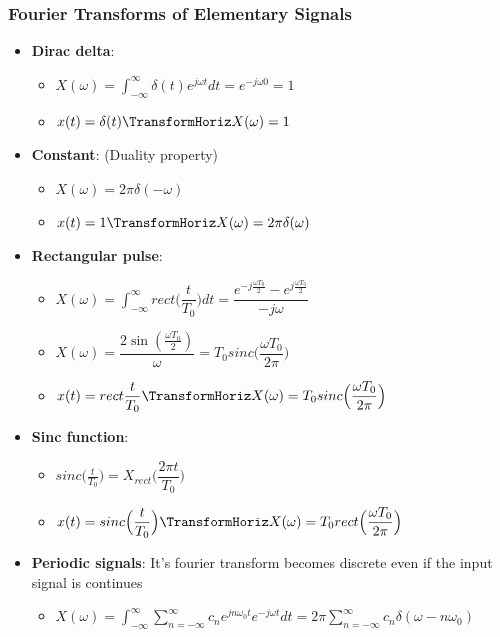 \subsubsection{Fourier Transforms of Elementary Signals}
\begin{itemize}
    \item \textbf{Dirac delta}:  
    \begin{itemize}
        \item $X(\omega) = \int_{-\infty}^{\infty} \delta(t)e^{j\omega t} dt = e^{-j\omega0} = 1$
        \item $x(t)=\delta(t) \TransformHoriz X(\omega)=1$
    \end{itemize}
    \item \textbf{Constant}: (Duality property)
    \begin{itemize}
        \item $X(\omega) = 2\pi\delta(-\omega)$
        \item $x(t)=1 \TransformHoriz X(\omega)=2\pi\delta(\omega)$
    \end{itemize}
    \item \textbf{Rectangular pulse}:
    \begin{itemize}
        \item $X(\omega) = \int_{-\infty}^{\infty} rect\Big( \dfrac{t}{T_0} \Big) dt = \dfrac{e^{-j\frac{\omega T_0}{2}}-e^{j\frac{\omega T_0}{2}}}{-j\omega}$
        \item $X(\omega) = \dfrac{2\sin(\frac{\omega T_0}{2})}{\omega} = T_0 sinc\Big( \dfrac{\omega T_0}{2\pi} \Big)$
        \item $x(t)=rect\dfrac{t}{T_0} \TransformHoriz X(\omega) = T_0 sinc\Big( \dfrac{\omega T_0}{2\pi} \Big)$
    \end{itemize}
    \item \textbf{Sinc function}:
    \begin{itemize}
        \item $sinc\Big( \frac{t}{T_0} \Big) = X_{rect}\Big( \dfrac{2\pi t}{T_0} \Big)$
        \item $x(t) = sinc\Big( \dfrac{t}{T_0} \Big) \TransformHoriz X(\omega) = T_0 rect\Big( \dfrac{\omega T_0}{2\pi} \Big)$
    \end{itemize}
    \item \textbf{Periodic signals}: It's fourier transform becomes discrete even if the input signal is continues
    \begin{itemize}
        \item $X(\omega) = \int_{-\infty}^{\infty} \sum_{n=-\infty}^{\infty} c_n e^{jn\omega_0 t} e^{-j\omega t} dt = 2\pi\sum_{n=-\infty}^{\infty} c_n \delta(\omega -n\omega_0)$
    \end{itemize}
\end{itemize}


